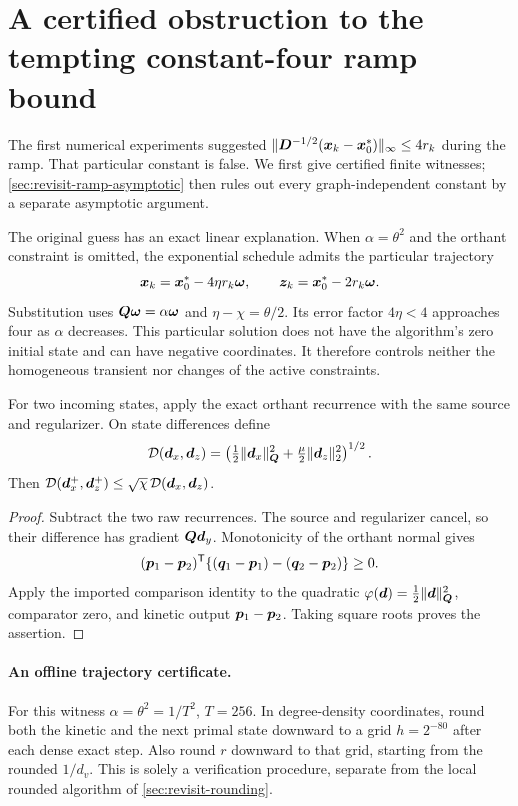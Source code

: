 \section{A certified obstruction to the tempting constant-four ramp bound}
\label{sec:revisit-ramp-four}
The first numerical experiments suggested
$\|\bm{D}^{-1/2}(\bm{x}_k-\bm{x}_0^*)\|_\infty\leq4r_k$ during the ramp.
That particular constant is false. We first give certified finite witnesses;
\cref{sec:revisit-ramp-asymptotic} then rules out every graph-independent
constant by a separate asymptotic argument.

The original guess has an exact linear explanation. When $\alpha=\theta^2$
and the orthant constraint is omitted, the exponential schedule admits the
particular trajectory
\[
 \bm{x}_k=\bm{x}_0^*-4\eta r_k\bm{\omega},\qquad
 \bm{z}_k=\bm{x}_0^*-2r_k\bm{\omega}.
\]
Substitution uses $\bm{Q}\bm{\omega}=\alpha\bm{\omega}$ and
$\eta-\chi=\theta/2$. Its error factor $4\eta<4$ approaches four as
$\alpha$ decreases. This particular solution does not have the algorithm's
zero initial state and can have negative coordinates. It therefore controls
neither the homogeneous transient nor changes of the active constraints.

\begin{lemma}
\label{lem:revisit-pairwise}
For two incoming states, apply the exact orthant recurrence with the same
source and regularizer. On state differences define
\[
 \mathcal D(\bm{d}_x,\bm{d}_z)
   =\left(\tfrac12\|\bm{d}_x\|_{\bm{Q}}^2
                   +\tfrac\mu2\|\bm{d}_z\|_2^2\right)^{1/2}.
\]
Then $\mathcal D(\bm{d}_x^+,\bm{d}_z^+)\leq\sqrt\chi\,
\mathcal D(\bm{d}_x,\bm{d}_z)$.
\end{lemma}
\begin{proof}
Subtract the two raw recurrences. The source and regularizer cancel, so
their difference has gradient $\bm{Q}\bm{d}_y$.
Monotonicity of the orthant normal gives
\[
 (\bm{p}_1-\bm{p}_2)^{\mathsf{T}}
       \{(\bm{q}_1-\bm{p}_1)-(\bm{q}_2-\bm{p}_2)\}\geq0.
\]
Apply the imported comparison identity to the quadratic
$\varphi(\bm{d})=\tfrac12\|\bm{d}\|_{\bm{Q}}^2$, comparator zero, and kinetic
output $\bm{p}_1-\bm{p}_2$. Taking square roots proves the assertion.
\end{proof}

\paragraph{An offline trajectory certificate.}
For this witness $\alpha=\theta^2=1/T^2$, $T=256$.
In degree-density coordinates, round both the kinetic and the next primal
state downward to a grid $h=2^{-80}$ after each dense exact step.
Also round $r$ downward to that grid, starting from the rounded $1/d_v$.
This is solely a verification procedure, separate from the local rounded
algorithm of \cref{sec:revisit-rounding}.

